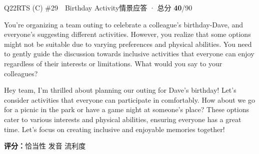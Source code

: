 \begin{qblock}{Q22\quad RTS (C) \#29\ \ Birthday Activity}{情景应答 · 总分 \textcolor{cAccent}{\bfseries 40}/90}
\begin{promptbox}
You're organizing a team outing to celebrate a colleague's birthday-Dave, and everyone's suggesting different activities. However, you realize that some options might not be suitable due to varying preferences and physical abilities. You need to gently guide the discussion towards inclusive activities that everyone can enjoy regardless of their interests or limitations. What would you say to your colleagues?
\end{promptbox}
\begin{modelbox}
Hey team, I'm thrilled about planning our outing for Dave's birthday! Let's consider activities that everyone can participate in comfortably. How about we go for a picnic in the park or have a game night at someone's place? These options cater to various interests and physical abilities, ensuring everyone has a great time. Let's focus on creating inclusive and enjoyable memories together!
\end{modelbox}
\asrlegend
\begin{asrbox}
                                                      
\end{asrbox}
\smallskip
{\small\textbf{评分：}恰当性  \quad\textperiodcentered\quad 发音  \quad\textperiodcentered\quad 流利度 }
\end{qblock}

